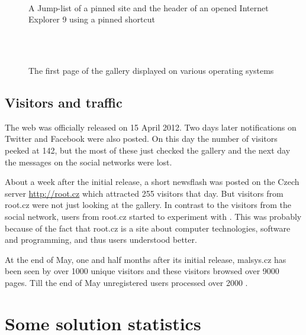 \begin{figure}[h]
	\centering
	 ~
	\caption{A Jump-list of a pinned site and the header of an opened Internet Explorer 9 using a pinned shortcut}
	\label{fig:galleryInDevices}
\end{figure}


\begin{figure}[p]
	\centering
	\\
	 ~
	 ~
	\caption{The first page of the gallery displayed on various operating systems}
	\label{fig:pinIe}
\end{figure}


\subsection{Visitors and traffic}

The web was officially released on 15 April 2012.
Two days later notifications on Twitter and Facebook were also posted.
On this day the number of visitors peeked at 142, but the most of these just checked the gallery and the next day the messages on the social networks were lost.

About a week after the initial release, a short newsflash was posted on the Czech server \url{http://root.cz} which attracted 255 visitors that day.
But visitors from root.cz were not just looking at the gallery.
In contrast to the visitors from the social network, users from root.cz started to experiment with \lsystems.
This was probably because of the fact that root.cz is a site about computer technologies, software and programming, and thus users understood \lsystems better.

At the end of May, one and half months after its initial release, malsys.cz has been seen by over 1000 unique visitors and these visitors browsed over 9000 pages.
Till the end of May unregistered users processed over 2000 \lsystems.


\section{Some solution statistics}

